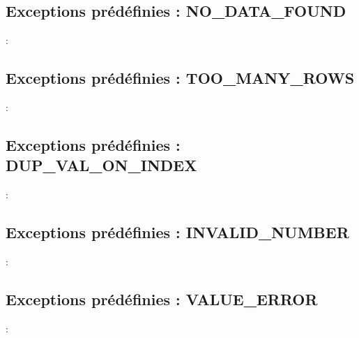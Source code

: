 \documentclass[10pt]{beamer}
\begin{document}
\subsection{Exceptions prédéfinies : NO\_DATA\_FOUND}
\begin{frame}{\secname : \subsecname}
    
\end{frame}

\subsection{Exceptions prédéfinies : TOO\_MANY\_ROWS}
\begin{frame}{\secname : \subsecname}
    
\end{frame}

\subsection{Exceptions prédéfinies : DUP\_VAL\_ON\_INDEX}
\begin{frame}{\secname : \subsecname}
    
\end{frame}

\subsection{Exceptions prédéfinies : INVALID\_NUMBER}
\begin{frame}{\secname : \subsecname}
    
\end{frame}

\subsection{Exceptions prédéfinies : VALUE\_ERROR}
\begin{frame}{\secname : \subsecname}
    
\end{frame}
\end{document}
